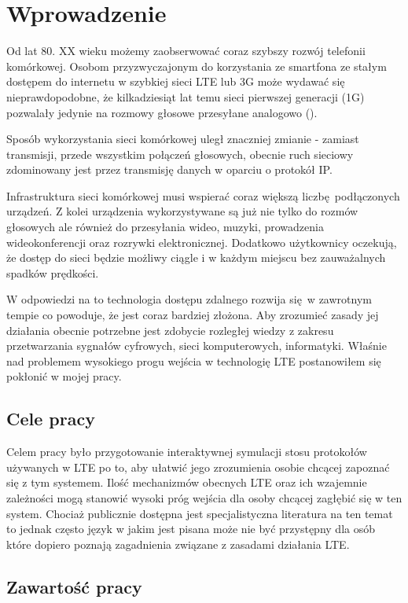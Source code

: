 \chapter{Wprowadzenie}
\label{cha:wprowadzenie}

Od lat 80. XX wieku możemy zaobserwować coraz szybszy rozwój telefonii komórkowej. Osobom przyzwyczajonym do korzystania ze smartfona ze stałym dostępem do internetu w szybkiej sieci LTE lub 3G może wydawać się nieprawdopodobne, że kilkadziesiąt lat temu sieci pierwszej generacji (1G) pozwalały jedynie na rozmowy głosowe przesyłane analogowo (\cite{TanWet11}).

Sposób wykorzystania sieci komórkowej uległ znaczniej zmianie - zamiast transmisji, przede wszystkim połączeń głosowych, obecnie ruch sieciowy zdominowany jest przez transmisję danych w oparciu o protokół IP.

Infrastruktura sieci komórkowej musi wspierać coraz większą liczbę podłączonych urządzeń. Z kolei urządzenia wykorzystywane są już nie tylko do rozmów głosowych ale również do przesyłania wideo, muzyki, prowadzenia wideokonferencji oraz rozrywki elektronicznej. Dodatkowo użytkownicy oczekują, że dostęp do sieci będzie możliwy ciągle i w każdym miejscu bez zauważalnych spadków prędkości.


W odpowiedzi na to technologia dostępu zdalnego rozwija się w zawrotnym tempie co powoduje, że jest coraz bardziej złożona. Aby zrozumieć zasady jej działania obecnie potrzebne jest zdobycie rozległej wiedzy z zakresu przetwarzania sygnałów cyfrowych, sieci komputerowych, informatyki. Właśnie nad problemem wysokiego progu wejścia w technologię LTE postanowiłem się pokłonić w mojej pracy.

\section{Cele pracy}					
\label{sec:celePracy}

Celem pracy było przygotowanie interaktywnej symulacji stosu protokołów używanych w LTE po to, aby ułatwić jego zrozumienia osobie chcącej zapoznać się z tym systemem. Ilość mechanizmów obecnych LTE oraz ich wzajemnie zależności mogą stanowić wysoki próg wejścia dla osoby chcącej zagłębić się w ten system. Chociaż publicznie dostępna jest specjalistyczna literatura na ten temat to jednak często język w jakim jest pisana może nie być przystępny dla osób które dopiero poznają zagadnienia związane z zasadami działania LTE. 

\section{Zawartość pracy}
\label{sec:zawartoscPracy}

